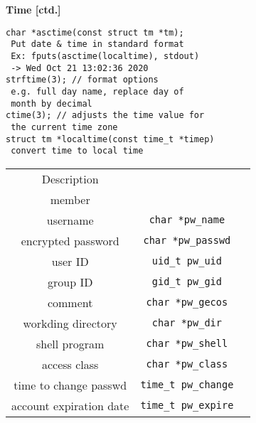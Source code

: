 \documentclass[10pt]{article}
\begin{document}
\begin{multicols}{2}
\begin{minipage}{1.5\columnwidth}
\begin{multicols*}{2}
\begin{minipage}{0.8\columnwidth}
                \textbf{Time [ctd.]}
                \begin{lstlisting}
char *asctime(const struct tm *tm);
 Put date & time in standard format
 Ex: fputs(asctime(localtime), stdout)
 -> Wed Oct 21 13:02:36 2020
strftime(3); // format options
 e.g. full day name, replace day of
 month by decimal
ctime(3); // adjusts the time value for
 the current time zone
struct tm *localtime(const time_t *timep)
 convert time to local time
                \end{lstlisting}
            \end{minipage}
            \columnbreak
            \begin{minipage}{0.5\columnwidth}
                \hspace*{3em}
                \begin{tabular}{|c|c|c|}
                    \hline
                    Description             & \makecell{\lstinline|struct passwd| \\member} \\
                    \hline \hline
                    username                & \lstinline|char *pw_name|           \\
                    encrypted password      & \lstinline|char *pw_passwd|         \\
                    user ID                 & \lstinline|uid_t pw_uid|            \\
                    group ID                & \lstinline|gid_t pw_gid|            \\
                    comment                 & \lstinline|char *pw_gecos|          \\
                    workding directory      & \lstinline|char *pw_dir|            \\
                    shell program           & \lstinline|char *pw_shell|          \\
                    access class            & \lstinline|char *pw_class|          \\
                    time to change passwd   & \lstinline|time_t pw_change|        \\
                    account expiration date & \lstinline|time_t pw_expire|        \\
                    \hline
                \end{tabular}
                \begin{tabular}{|c|c|c|}

\end{tabular}
\end{minipage}
\end{multicols*}
\end{minipage}
\end{multicols}
\end{document}
